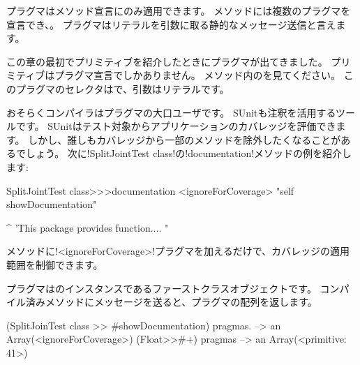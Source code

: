 \documentclass[a4paper,10pt,twoside]{book}
\begin{document}
プラグマはメソッド宣言にのみ適用できます。
メソッドには複数のプラグマを宣言でき、。
プラグマはリテラルを引数に取る静的なメッセージ送信と言えます。

この章の最初でプリミティブを紹介したときにプラグマが出てきました。
プリミティブはプラグマ宣言でしかありません。
メソッド内のを見てください。
このプラグマのセレクタはで、引数はリテラルです。

おそらくコンパイラはプラグマの大口ユーザです。
SUnitも注釈を活用するツールです。
SUnitはテスト対象からアプリケーションのカバレッジを評価できます。
しかし、誰しもカバレッジから一部のメソッドを除外したくなることがあるでしょう。
次に\ct!SplitJointTest class!の\ct!documentation!メソッドの例を紹介します:

\begin{code}{}
SplitJointTest class>>>documentation
	<ignoreForCoverage>
	"self showDocumentation"
	
	^ 'This package provides function.... "
\end{code}

メソッドに\ct!<ignoreForCoverage>!プラグマを加えるだけで、カバレッジの適用範囲を制御できます。


%	


プラグマはのインスタンスであるファーストクラスオブジェクトです。
コンパイル済みメソッドにメッセージを送ると、プラグマの配列を返します。

\begin{code}{}
(SplitJoinTest class >> #showDocumentation) pragmas.
  --> an Array(<ignoreForCoverage>)
(Float>>#+) pragmas --> an Array(<primitive: 41>)
\end{code}
\end{document}
